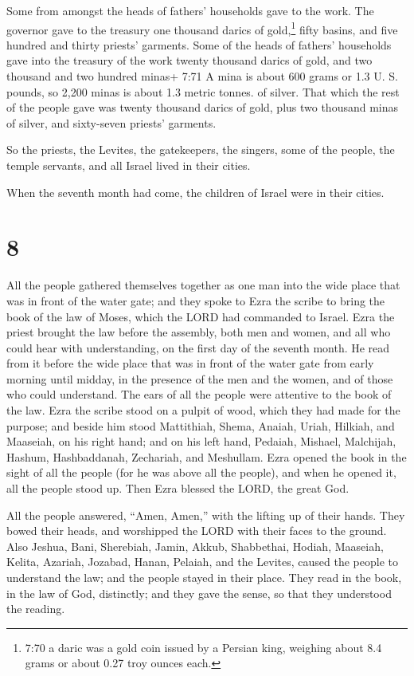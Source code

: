  Some from amongst the heads of fathers' households gave to
the work. The governor gave to the treasury one thousand darics of
gold,\footnote{7:70 a daric was a gold coin issued by a Persian king,
  weighing about 8.4 grams or about 0.27 troy ounces each.} fifty
basins, and five hundred and thirty priests' garments. 
Some of the heads of fathers' households gave into the treasury of the
work twenty thousand darics of gold, and two thousand and two hundred
minas+ 7:71 A mina is about 600 grams or 1.3 U. S. pounds, so 2,200
minas is about 1.3 metric tonnes. of silver.  That which
the rest of the people gave was twenty thousand darics of gold, plus two
thousand minas of silver, and sixty-seven priests' garments.

 So the priests, the Levites, the gatekeepers, the singers,
some of the people, the temple servants, and all Israel lived in their
cities.

When the seventh month had come, the children of Israel were in their
cities.

\hypertarget{section-7}{%
\section{8}\label{section-7}}

 All the people gathered themselves together as one man into
the wide place that was in front of the water gate; and they spoke to
Ezra the scribe to bring the book of the law of Moses, which the LORD
had commanded to Israel.  Ezra the priest brought the law
before the assembly, both men and women, and all who could hear with
understanding, on the first day of the seventh month.  He
read from it before the wide place that was in front of the water gate
from early morning until midday, in the presence of the men and the
women, and of those who could understand. The ears of all the people
were attentive to the book of the law.  Ezra the scribe
stood on a pulpit of wood, which they had made for the purpose; and
beside him stood Mattithiah, Shema, Anaiah, Uriah, Hilkiah, and
Maaseiah, on his right hand; and on his left hand, Pedaiah, Mishael,
Malchijah, Hashum, Hashbaddanah, Zechariah, and Meshullam. 
Ezra opened the book in the sight of all the people (for he was above
all the people), and when he opened it, all the people stood up.
 Then Ezra blessed the LORD, the great God.

All the people answered, ``Amen, Amen,'' with the lifting up of their
hands. They bowed their heads, and worshipped the LORD with their faces
to the ground.  Also Jeshua, Bani, Sherebiah, Jamin, Akkub,
Shabbethai, Hodiah, Maaseiah, Kelita, Azariah, Jozabad, Hanan, Pelaiah,
and the Levites, caused the people to understand the law; and the people
stayed in their place.  They read in the book, in the law of
God, distinctly; and they gave the sense, so that they understood the
reading.

